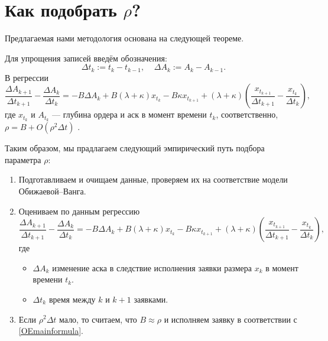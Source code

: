 \section{Как подобрать $\rho$?}
Предлагаемая нами методология основана на следующей теореме.
\begin{theorem}\label{lilreg}
    Для упрощения записей введём обозначения:
    \[
    \Delta t_{k} := t_{k} - t_{k-1}, \; \; \; \;   
    \Delta A_{k} := A_{k} - A_{k-1}. 
    \]
    В регрессии                                                                                                                                                                                                                                                                                                                                                                                       
    \begin{equation*}
            \frac{\Delta A_{k+1}}{\Delta t_{k+1}} - \frac{\Delta A_{k}}{\Delta t_{k}}
            = -B \Delta A_k + B (\lambda + \kappa) x_{t_k} - B \kappa x_{t_{k+1}} + 
            (\lambda + \kappa) \left(\frac{x_{t_{k+1}}}{\Delta t_{k+1}} - \frac{x_{t_k}}{\Delta t_{k}}\right),
    \end{equation*}
    где $x_{t_k}$ и $A_{t_k}$ --- глубина ордера и аск в момент времени $t_k$, соответственно, \\
    $\rho = B + O(\rho^2 \Delta t)$ .
\end{theorem}
Таким образом, мы прадлагаем следующий эмпирический путь подбора параметра $\rho$:
\begin{enumerate}
    \item Подготавливаем и очищаем данные, проверяем их на соответствие модели Обижаевой--Ванга.
    \item Оцениваем по данным регрессию
    \begin{equation*}
        \frac{\Delta A_{k+1}}{\Delta t_{k+1}} - \frac{\Delta A_{k}}{\Delta t_{k}}
            = -B \Delta A_k + B (\lambda + \kappa) x_{t_k} - B \kappa x_{t_{k+1}} + 
            (\lambda + \kappa) \left(\frac{x_{t_{k+1}}}{\Delta t_{k+1}} - \frac{x_{t_k}}{\Delta t_{k}}\right),
    \end{equation*} 
    где
    \begin{itemize}
        \item $\Delta A_{k}$ изменение аска в следствие исполнения заявки размера $x_k$ в момент времени $t_k$.
        \item $\Delta t_{k}$ время между $k$ и $k + 1$ заявками.
    \end{itemize}
    \item Если $\rho^2 \Delta t$ мало, то считаем, что $B \approx \rho$ и исполняем заявку в соответствии с \eqref{OEmainformula}.
\end{enumerate}
